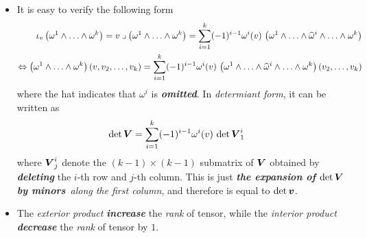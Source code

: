 \documentclass[11pt]{article}
\begin{document}
\begin{itemize}
\item \begin{remark} It is easy to verify the following form
\begin{align}
\iota_v\left(\omega^1 \wedge \ldots \wedge \omega^{k}\right) = v\mathbin{\lrcorner }{\left(\omega^1 \wedge \ldots \wedge \omega^{k}\right)}= \sum_{i=1}^{k}(-1)^{i-1}\omega^{i}(v)\,\left(\omega^1 \wedge \ldots \wedge \widehat{\omega}^{i} \wedge \ldots \wedge \omega^{k}\right) \label{eqn: interior_product_expansion}\\
\Leftrightarrow \left(\omega^1 \wedge \ldots \wedge \omega^{k}\right)(v, v_2, \ldots, v_k)= \sum_{i=1}^{k}(-1)^{i-1}\omega^{i}(v)\,\left(\omega^1 \wedge \ldots \wedge \widehat{\omega}^{i} \wedge \ldots \wedge \omega^{k}\right)(v_2, \ldots, v_k) \nonumber
\end{align} where the hat indicates that $\omega^i$ is \emph{\textbf{omitted}}. In \emph{determiant form}, it can be written as
\begin{align}
\det{\boldsymbol{V}} &=  \sum_{i=1}^{k}(-1)^{i-1}\omega^{i}(v)\,\det\boldsymbol{V}_{1}^{i}  \label{eqn: interior_product_determinant_expansion}
\end{align} where $\boldsymbol{V}_{j}^{i}$ denote the $(k -1) \times (k -1)$ submatrix of $\boldsymbol{V}$ obtained by \emph{\textbf{deleting}} the $i$-th row and $j$-th column.  This is just \emph{\textbf{the expansion of $\det \boldsymbol{V}$ by minors}\ along the first column}, and therefore is equal to $\det \boldsymbol{v}$. 
\end{remark}

\item \begin{remark} 
The \emph{exterior product} \emph{\textbf{increase}} the \emph{rank} of tensor, while the \emph{interior product} \emph{\textbf{decrease}} the \emph{rank} of tensor by $1$.
\end{remark}
\end{itemize}
\end{document}
